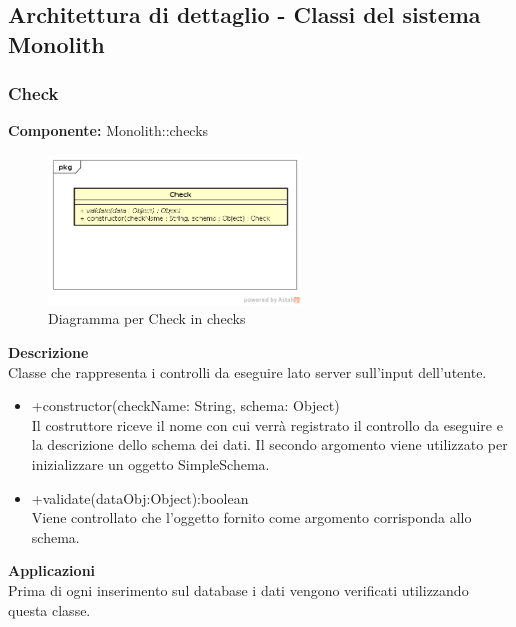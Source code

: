 \clearpage

\subsection{Architettura di dettaglio - Classi del sistema Monolith}\subsubsection{Check}
\textbf{Componente:}  Monolith::checks\\
   \FloatBarrier
   \begin{figure}[ht]
   \centering
   \includegraphics[width=0.6\textwidth]{img/single-Check}
   \caption{{Diagramma per Check in checks}}
\end{figure}
\FloatBarrier
\textbf{Descrizione}\\
Classe che rappresenta i controlli da eseguire lato server sull'input dell'utente. 
\begin{itemize}
\item +constructor(checkName: String, schema: Object) \\
Il costruttore riceve il nome con cui verrà registrato il controllo da eseguire e la descrizione dello schema dei dati. Il secondo argomento viene utilizzato per inizializzare un oggetto SimpleSchema.
\item +validate(dataObj:Object):boolean \\
Viene controllato che l'oggetto fornito come argomento corrisponda allo schema.
\end{itemize} 


\textbf{Applicazioni}\\
Prima di ogni inserimento sul database i dati vengono verificati utilizzando questa classe. 


\clearpage


